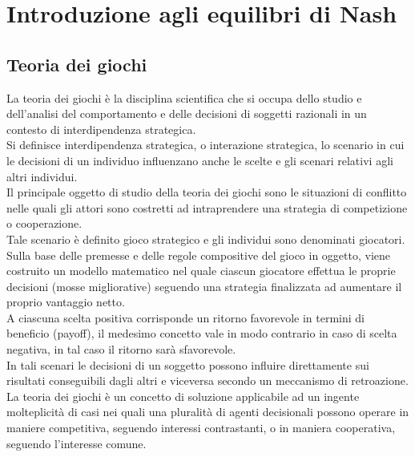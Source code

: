 \chapter{Introduzione agli equilibri di Nash}

\section{Teoria dei giochi}
\justify
La teoria dei giochi è la disciplina scientifica che si occupa dello studio e dell'analisi del comportamento e delle decisioni di soggetti razionali in un contesto di interdipendenza strategica.\\

Si definisce interdipendenza strategica, o interazione strategica, lo scenario in cui le decisioni di un individuo influenzano anche le scelte e gli scenari relativi agli altri individui.\\

Il principale oggetto di studio della teoria dei giochi sono le situazioni di conflitto nelle quali gli attori sono costretti ad intraprendere una strategia di competizione o cooperazione.\\

Tale scenario è definito gioco strategico e gli individui sono denominati giocatori.\\

Sulla base delle premesse e delle regole compositive del gioco in oggetto, viene costruito un modello matematico nel quale ciascun giocatore effettua le proprie decisioni (mosse migliorative) seguendo una strategia finalizzata ad aumentare il proprio vantaggio netto.\\

A ciascuna scelta positiva corrisponde un ritorno favorevole in termini di beneficio (payoff), il medesimo concetto vale in modo contrario in caso di scelta negativa, in tal caso il ritorno sarà sfavorevole.\\

In tali scenari le decisioni di un soggetto possono influire direttamente sui risultati conseguibili dagli altri e viceversa secondo un meccanismo di retroazione.\\

La teoria dei giochi è un concetto di soluzione applicabile ad un ingente molteplicità di casi nei quali una pluralità di agenti decisionali possono operare in maniere competitiva, seguendo interessi contrastanti, o in maniera  cooperativa, seguendo l'interesse comune.\\

